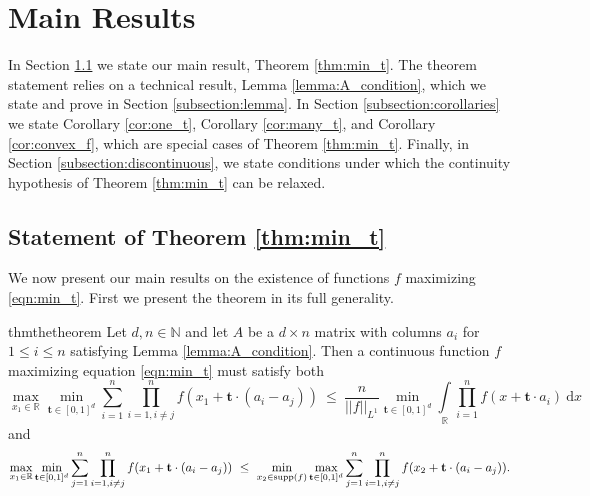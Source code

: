 \documentclass[11pt,reqno]{amsart}
\numberwithin{equation}{section}
\theoremstyle{plain}
\newcommand{\R}{\ensuremath{\mathbb{R}}}
\newcommand{\N}{\mathbb{N}}
\begin{document}

\section{Main Results}\label{section:main_results}

In Section \ref{subsection:theorem_statement} we state our main result, Theorem \ref{thm:min_t}. The theorem statement relies on a technical result, Lemma \ref{lemma:A_condition}, which we state and prove in Section \ref{subsection:lemma}. In Section \ref{subsection:corollaries} we state Corollary \ref{cor:one_t}, Corollary \ref{cor:many_t}, and Corollary \ref{cor:convex_f}, which are special cases of Theorem \ref{thm:min_t}. Finally, in Section \ref{subsection:discontinuous}, we state conditions under which the continuity hypothesis of Theorem \ref{thm:min_t} can be relaxed.

\subsection{Statement of Theorem \ref{thm:min_t}}\label{subsection:theorem_statement}

We now present our main results on the existence of functions $f$ maximizing \eqref{eqn:min_t}. First we present the theorem in its full generality.

\begin{restatable}{thm}{thetheorem}\label{thm:min_t}
Let $d,n \in \N$ and let $A$ be a $d \times n$ matrix with columns $a_i$ for $1 \leq i \leq n$ satisfying Lemma \ref{lemma:A_condition}. Then a continuous function $f$ maximizing equation \eqref{eqn:min_t} must satisfy both
\begin{equation}
    \max\limits_{x_1 \in \R}\min\limits_{\mathbf{t}\in[0,1]^d}\sum\limits_{i=1}^{n}\prod\limits_{i=1,i\neq j}^{n}f(x_1+\mathbf{t}\cdot (a_i-a_j))\ \le \ \frac{n}{||f||_{L^1}}\min\limits_{\mathbf{t}\in[0,1]^d}\int\limits_{\R}\prod\limits_{i=1}^{n}f(x+\mathbf{t}\cdot a_i)\ \mathrm{d}x
\end{equation}
and
\begin{equation}
    \max\limits_{x_1 \in \R}\min\limits_{\mathbf{t}\in[0,1]^d}\sum\limits_{j=1}^n \prod\limits_{i=1,i\neq j}^{n}f(x_1+\mathbf{t}\cdot (a_i-a_j))\ \le \ \min\limits_{x_2 \in {\rm supp}(f)}\max\limits_{\mathbf{t}\in[0,1]^d}\sum\limits_{j=1}^n \prod\limits_{i=1,i\neq j}^{n}f(x_2+\mathbf{t}\cdot (a_i-a_j)).
\end{equation}
\end{restatable}
\end{document}
